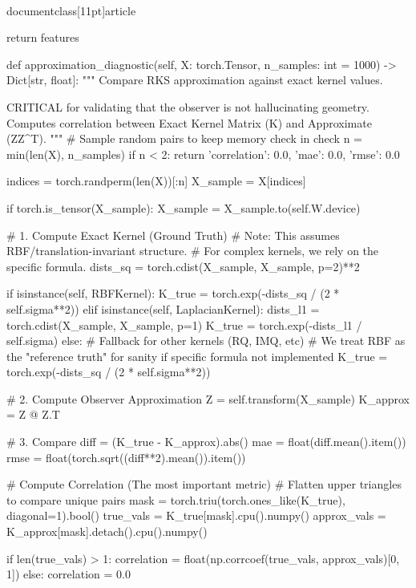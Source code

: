 \\documentclass[11pt]{article}
\begin{document}
\begin{CodeBlock}
        return features

    def approximation_diagnostic(self, X: torch.Tensor, n_samples: int = 1000) -> Dict[str, float]:
        """
        Compare RKS approximation against exact kernel values.
        
        CRITICAL for validating that the observer is not hallucinating geometry.
        Computes correlation between Exact Kernel Matrix (K) and Approximate (ZZ^T).
        """
        # Sample random pairs to keep memory check in check
        n = min(len(X), n_samples)
        if n < 2: 
            return {'correlation': 0.0, 'mae': 0.0, 'rmse': 0.0}
            
        indices = torch.randperm(len(X))[:n]
        X_sample = X[indices]
        
        if torch.is_tensor(X_sample):
            X_sample = X_sample.to(self.W.device)
            
        # 1. Compute Exact Kernel (Ground Truth)
        # Note: This assumes RBF/translation-invariant structure. 
        # For complex kernels, we rely on the specific formula.
        dists_sq = torch.cdist(X_sample, X_sample, p=2)**2
        
        if isinstance(self, RBFKernel):
            K_true = torch.exp(-dists_sq / (2 * self.sigma**2))
        elif isinstance(self, LaplacianKernel):
            dists_l1 = torch.cdist(X_sample, X_sample, p=1)
            K_true = torch.exp(-dists_l1 / self.sigma)
        else:
            # Fallback for other kernels (RQ, IMQ, etc)
            # We treat RBF as the "reference truth" for sanity if specific formula not implemented
            K_true = torch.exp(-dists_sq / (2 * self.sigma**2))

        # 2. Compute Observer Approximation
        Z = self.transform(X_sample)
        K_approx = Z @ Z.T
        
        # 3. Compare
        diff = (K_true - K_approx).abs()
        mae = float(diff.mean().item())
        rmse = float(torch.sqrt((diff**2).mean()).item())
        
        # Compute Correlation (The most important metric)
        # Flatten upper triangles to compare unique pairs
        mask = torch.triu(torch.ones_like(K_true), diagonal=1).bool()
        true_vals = K_true[mask].cpu().numpy()
        approx_vals = K_approx[mask].detach().cpu().numpy()
        
        if len(true_vals) > 1:
            correlation = float(np.corrcoef(true_vals, approx_vals)[0, 1])
        else:
            correlation = 0.0
            

\end{CodeBlock}
\end{document}
